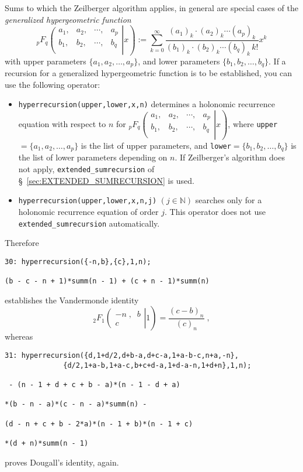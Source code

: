 Sums to which the Zeilberger algorithm applies, in general are
special cases of the \textsl{generalized hypergeometric function}
\[
_{p}F_{q}\left.\left(\begin{array}{cccc}
a_{1},&a_{2},&\cdots,&a_{p}\\
b_{1},&b_{2},&\cdots,&b_{q}\\
            \end{array}\right| x\right)
:=
\sum_{k=0}^\infty \frac
{(a_{1})_{k}\cdot(a_{2})_{k}\cdots(a_{p})_{k}}
{(b_{1})_{k}\cdot(b_{2})_{k}\cdots(b_{q})_{k}\,k!}x^{k}
\label{eq:coefficientformula}
\]
with upper parameters $\{a_{1}, a_{2}, \ldots, a_{p}\}$, and lower
parameters $\{b_{1}, b_{2}, \ldots, b_{q}\}$. If a recursion for a
generalized hypergeometric function is to be established, you can use
the following \REDUCE{} operator:
\begin{itemize}
\item
\texttt{hyperrecursion(upper,lower,x,n)} determines a holonomic recurrence
equation with respect to $n$ for
$_{p}F_{q}\left.\left(\begin{array}{cccc}
a_{1},&a_{2},&\cdots,&a_{p}\\
b_{1},&b_{2},&\cdots,&b_{q}\\
            \end{array}\right| x\right)
$, where \texttt{upper}$=\{a_{1}, a_{2}, \ldots, a_{p}\}$
is the list of upper parameters, and
\texttt{lower}$=\{b_{1}, b_{2}, \ldots, b_{q}\}$
is the list of lower parameters depending on $n$. If Zeilberger's algorithm
does not apply, \texttt{extended\_sumrecursion}
of \S~\ref{sec:EXTENDED_SUMRECURSION} is used.
\item
\texttt{hyperrecursion(upper,lower,x,n,j)} $(j\in\mathbb{N})$
searches only for a holonomic recurrence equation of order $j$. This
operator does not use \texttt{extended\_sumrecursion} automatically.
\end{itemize}
Therefore

{\small
\begin{verbatim}
30: hyperrecursion({-n,b},{c},1,n);

(b - c - n + 1)*summ(n - 1) + (c + n - 1)*summ(n)
\end{verbatim}
}\noindent
establishes the Vandermonde identity
\[
_2 F_1\left.
\left(
\begin{array}{c}
-n\;,\;\;b\\[1mm]
c
\end{array}
\right| 1\right)
=\frac{(c-b)_n}{(c)_n}
\;,
\]
whereas

{\small
\begin{verbatim}
31: hyperrecursion({d,1+d/2,d+b-a,d+c-a,1+a-b-c,n+a,-n},
              {d/2,1+a-b,1+a-c,b+c+d-a,1+d-a-n,1+d+n},1,n);

 - (n - 1 + d + c + b - a)*(n - 1 - d + a)

*(b - n - a)*(c - n - a)*summ(n) - 

(d - n + c + b - 2*a)*(n - 1 + b)*(n - 1 + c)

*(d + n)*summ(n - 1)
\end{verbatim}
}\noindent
proves Dougall's identity, again.

